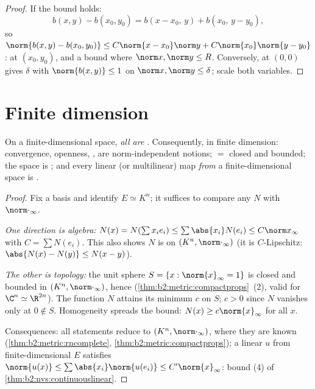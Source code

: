\begin{proof}
If the bound holds:
\[
b(x,y) - b(x_0,y_0) = b(x - x_0,\, y) + b(x_0,\, y - y_0),
\]
so $\norm{b(x,y) - b(x_0,y_0)} \leq C\norm{x - x_0}\norm y +
C\norm{x_0}\norm{y - y_0}$:  at $(x_0, y_0)$, and a
 bound where $\norm x, \norm y \leq R$. Conversely,
 at $(0,0)$ gives $\delta$ with $\norm{b(x,y)} \leq 1$ on
$\norm x, \norm y \leq \delta$; scale both variables.
\end{proof}

\section{Finite dimension}

\begin{theorem}\label{thm:b2:nvs:finitedim}
On a finite-dimensional space, \emph{all  are
}. Consequently, in finite
dimension: convergence, openness, ,  are
norm-independent notions;  $=$ closed and bounded;
the space is ; and every linear (or multilinear) map
\emph{from} a finite-dimensional space is .
\end{theorem}

\begin{proof}
Fix a basis and identify $E \simeq K^n$; it suffices to compare any
 $N$ with $\norm\cdot_\infty$.

\emph{One direction is algebra:} $N(x) = N(\sum x_i e_i) \leq
\sum \abs{x_i} N(e_i) \leq C \norm x_\infty$ with $C = \sum N(e_i)$.
This also shows $N$ is  on $(K^n, \norm\cdot_\infty)$
(it is $C$-Lipschitz: $\abs{N(x) - N(y)} \leq N(x - y)$).

\emph{The other is topology:} the unit sphere $S = \{x :
\norm{x}_\infty = 1\}$ is closed and bounded in $(K^n,
\norm\cdot_\infty)$, hence 
(\cref{thm:b2:metric:compactprops}~(2), valid for $\C^n \simeq
\R^{2n}$). The  function $N$ attains its minimum $c$ on
$S$; $c > 0$ since $N$ vanishes only at $0 \notin S$. Homogeneity
spreads the bound: $N(x) \geq c \norm{x}_\infty$ for all $x$.

Consequences: all statements reduce to $(K^n,
\norm\cdot_\infty)$, where they are known
(\cref{thm:b2:metric:rncomplete},
\cref{thm:b2:metric:compactprops}); a linear $u$ from
finite-dimensional $E$ satisfies $\norm{u(x)} \leq \sum\abs{x_i}
\norm{u(e_i)} \leq C'\norm{x}_\infty$: bound (4) of
\cref{thm:b2:nvs:continuouslinear}.
\end{proof}

